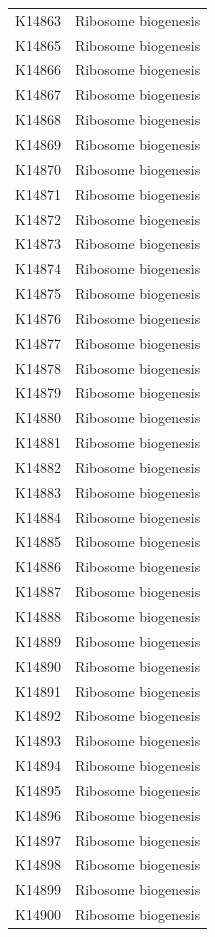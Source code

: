 \begin{longtable}{@{}l l@{}}
K14863 & Ribosome biogenesis \\
K14865 & Ribosome biogenesis \\
K14866 & Ribosome biogenesis \\
K14867 & Ribosome biogenesis \\
K14868 & Ribosome biogenesis \\
K14869 & Ribosome biogenesis \\
K14870 & Ribosome biogenesis \\
K14871 & Ribosome biogenesis \\
K14872 & Ribosome biogenesis \\
K14873 & Ribosome biogenesis \\
K14874 & Ribosome biogenesis \\
K14875 & Ribosome biogenesis \\
K14876 & Ribosome biogenesis \\
K14877 & Ribosome biogenesis \\
K14878 & Ribosome biogenesis \\
K14879 & Ribosome biogenesis \\
K14880 & Ribosome biogenesis \\
K14881 & Ribosome biogenesis \\
K14882 & Ribosome biogenesis \\
K14883 & Ribosome biogenesis \\
K14884 & Ribosome biogenesis \\
K14885 & Ribosome biogenesis \\
K14886 & Ribosome biogenesis \\
K14887 & Ribosome biogenesis \\
K14888 & Ribosome biogenesis \\
K14889 & Ribosome biogenesis \\
K14890 & Ribosome biogenesis \\
K14891 & Ribosome biogenesis \\
K14892 & Ribosome biogenesis \\
K14893 & Ribosome biogenesis \\
K14894 & Ribosome biogenesis \\
K14895 & Ribosome biogenesis \\
K14896 & Ribosome biogenesis \\
K14897 & Ribosome biogenesis \\
K14898 & Ribosome biogenesis \\
K14899 & Ribosome biogenesis \\
K14900 & Ribosome biogenesis \\

\end{longtable}
